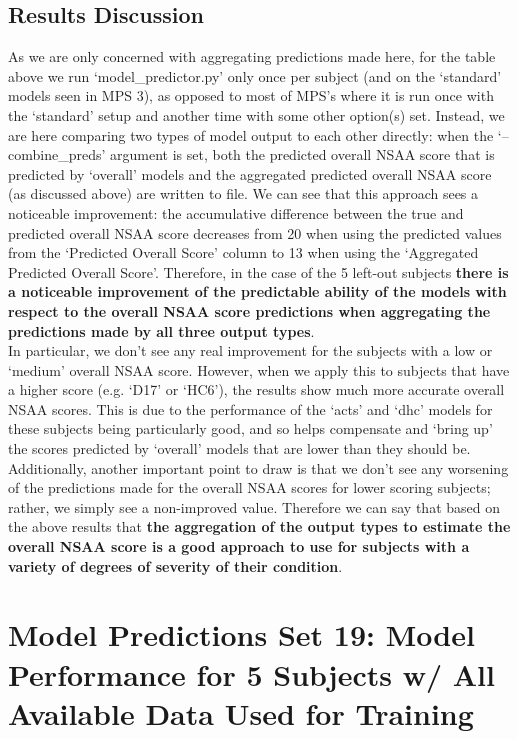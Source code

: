 \documentclass[12pt,twoside]{report}
\begin{document}
\subsection{Results Discussion}

\quad As we are only concerned with aggregating predictions made here, for the table above we run ‘model\_predictor.py’ only once per subject (and on the ‘standard’ models seen in MPS 3), as opposed to most of MPS’s where it is run once with the ‘standard’ setup and another time with some other option(s) set. Instead, we are here comparing two types of model output to each other directly: when the ‘--combine\_preds’ argument is set, both the predicted overall NSAA score that is predicted by ‘overall’ models and the aggregated predicted overall NSAA score (as discussed above) are written to file. We can see that this approach sees a noticeable improvement: the accumulative difference between the true and predicted overall NSAA score decreases from 20 when using the predicted values from the ‘Predicted Overall Score’ column to 13 when using the ‘Aggregated Predicted Overall Score’. Therefore, in the case of the 5 left-out subjects \textbf{there is a noticeable improvement of the predictable ability of the models with respect to the overall NSAA score predictions when aggregating the predictions made by all three output types}.\\

\quad In particular, we don’t see any real improvement for the subjects with a low or ‘medium’ overall NSAA score. However, when we apply this to subjects that have a higher score (e.g. ‘D17’ or ‘HC6’), the results show much more accurate overall NSAA scores. This is due to the performance of the ‘acts’ and ‘dhc’ models for these subjects being particularly good, and so helps compensate and ‘bring up’ the scores predicted by ‘overall’ models that are lower than they should be. Additionally, another important point to draw is that we don’t see any worsening of the predictions made for the overall NSAA scores for lower scoring subjects; rather, we simply see a non-improved value. Therefore we can say that based on the above results that \textbf{the aggregation of the output types to estimate the overall NSAA score is a good approach to use for subjects with a variety of degrees of severity of their condition}.






\section{Model Predictions Set 19: Model Performance for 5 Subjects w/ All Available Data Used for Training}
\end{document}
